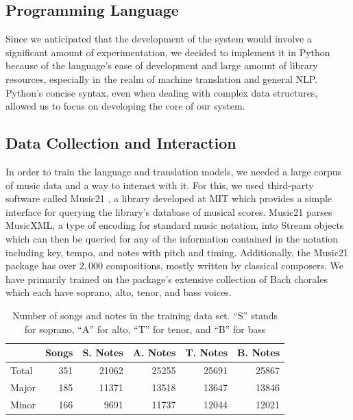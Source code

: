 \documentclass{sig-alternate}
\begin{document}
\subsection{Programming Language}
Since we anticipated that the development of the system would involve a significant amount of experimentation, we decided to implement it in Python because of the language's ease of development and large amount of library resources, especially in the realm of machine translation and general NLP. Python's concise syntax, even when dealing with complex data structures, allowed us to focus on developing the core of our system.

\subsection{Data Collection and Interaction}
In order to train the language and translation models, we needed a large corpus of music data and a way to interact with it. For this,
we used third-party software called Music21 \cite{Cuthbert_music21:a}, a library developed at MIT which provides a simple interface for querying the library's database of musical scores. Music21 parses MusicXML, a type of encoding for standard music notation, into Stream objects which can then be queried for any of the information contained in the notation including key, tempo, and notes with pitch and timing. Additionally, the Music21 package has over $2,000$ compositions, mostly written by classical composers. We have primarily trained on the package's extensive collection of Bach chorales which each have soprano, alto, tenor, and bass voices.

\begin{table}[h]
  \begin{center}
      \begin{tabular}{| l | r | r | r | r | r |}
      \hline
       \  & Songs & S. Notes & A. Notes & T. Notes & B. Notes \\ \hline
       Total &  351 & 21062 & 25255 & 25691 & 25867 \\ \hline
       Major &  185 & 11371 & 13518 & 13647 & 13846 \\ \hline
       Minor & 166 & 9691 & 11737 & 12044 & 12021  \\ \hline
      \end{tabular}
  \end{center}
  \caption{Number of songs and notes in the training data set. ``S'' stands for soprano, ``A'' for alto, ``T'' for tenor, and ``B'' for bass}
\end{table}
\end{document}
